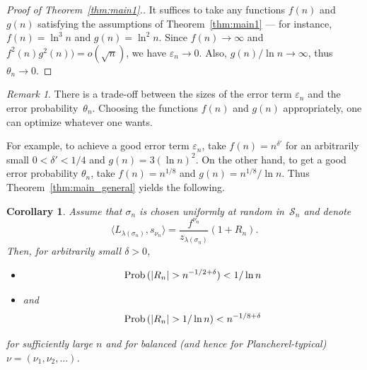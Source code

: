 \documentclass[12pt]%
{amsart}
\renewcommand\S{{\mathcal S}}
\newcommand{\la}{{\lambda}}
\newcommand{\si}{{\sigma}}
\newcommand{\Prob}{{\rm Prob}}
\def\magenta#1{{\color{magenta}{#1}}}
\theoremstyle{plain}
\newtheorem{corollary}[theorem]{Corollary}
\theoremstyle{definition}
\theoremstyle{remark}
\newtheorem{remark}[theorem]{Remark}
\newcommand{\ve}{\varepsilon}
\begin{document}
\begin{proof}[Proof of Theorem~\ref{thm:main1}.] 
It suffices to take any functions $f(n)$ and $g(n)$ satisfying the assumptions of  Theorem~\ref{thm:main1} --- for instance,
$f(n)=\ln^3n$ and $g(n)=\ln^2n$. 
Since
$f(n)\to \infty$ and $f^2(n)g^2(n))=o(\sqrt n)$, we have 
$\ve_n\to 0$. Also, $g(n) / \ln n\to\infty$, thus $\theta_n\to 0$. 
\end{proof}

\begin{remark}
    There is a trade-off between the sizes of the error term $\ve_n$ and the error probability~$\theta_n$. Choosing the functions $f(n)$ and $g(n)$ appropriately, one can optimize whatever one wants. 
\end{remark}

For example, to achieve a good error term $\ve_n$, take $f(n) = n^{\delta'}$ for an arbitrarily small $0<\delta'<1/4$ and $g(n) = 3 (\ln n)^2$. 
On the other hand, to get a good error probability $\theta_n$, take  $f(n)=n^{1/8}$ and $g(n)=n^{1/8}/\ln n$. 
Thus Theorem~\ref{thm:main_general} yields the following.


\begin{corollary}\label{thm:main_cor1}
    Assume that $\si_n$ is chosen uniformly at random in~$\S_n$ and denote
    \[
        \langle L_{\la(\si_n)},s_{\nu_n} \rangle 
        = \frac{f^{\nu_n}}{z_{\la(\si_n)}} (1+R_n). 
    \]
    Then, for arbitrarily small $\delta>0$, 
    \begin{itemize}
        \item[(a)] 
        \[
            \Prob\,(|R_n| > n^{-1/2+\delta}) 
            < 1 / \ln n 
        \]
        \item[(b)]
        and
        \[
            \Prob\,(|R_n| > 1/\ln n) 
            < n^{-1/8 + \delta}
        \]

    \end{itemize}
    for sufficiently large $n$ and for balanced (and hence for Plancherel-typical) $\nu=(\nu_1,\nu_2,\ldots)$. 
\end{corollary}
\end{document}
